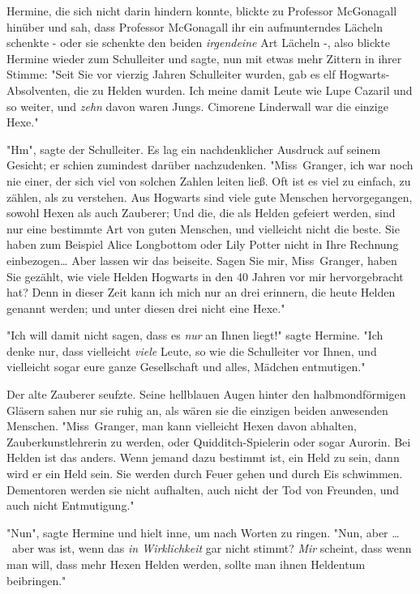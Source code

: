 {Hermine, die sich nicht darin hindern konnte, blickte zu Professor McGonagall hinüber und sah, dass Professor McGonagall ihr ein aufmunterndes Lächeln schenkte - oder sie schenkte den beiden \emph{irgendeine} Art Lächeln -, also blickte Hermine wieder zum Schulleiter und sagte, nun mit etwas mehr Zittern in ihrer Stimme: "Seit Sie vor vierzig Jahren Schulleiter wurden, gab es elf Hogwarts-Absolventen, die zu Helden wurden. Ich meine damit Leute wie Lupe Cazaril und so weiter, und \emph{zehn} davon waren Jungs. Cimorene Linderwall war die einzige Hexe."

"Hm", sagte der Schulleiter. Es lag ein nachdenklicher Ausdruck auf seinem Gesicht; er schien zumindest darüber nachzudenken. "Miss~Granger, ich war noch nie einer, der sich viel von solchen Zahlen leiten ließ. Oft ist es viel zu einfach, zu zählen, als zu verstehen. Aus Hogwarts sind viele gute Menschen hervorgegangen, sowohl Hexen als auch Zauberer; Und die, die als Helden gefeiert werden, sind nur eine bestimmte Art von guten Menschen, und vielleicht nicht die beste. Sie haben zum Beispiel Alice Longbottom oder Lily Potter nicht in Ihre Rechnung einbezogen… Aber lassen wir das beiseite. Sagen Sie mir, Miss~Granger, haben Sie gezählt, wie viele Helden Hogwarts in den 40 Jahren vor mir hervorgebracht hat? Denn in dieser Zeit kann ich mich nur an drei erinnern, die heute Helden genannt werden; und unter diesen drei nicht eine Hexe."

"Ich will damit nicht sagen, dass es \emph{nur} an Ihnen liegt!" sagte Hermine. "Ich denke nur, dass vielleicht \emph{viele} Leute, so wie die Schulleiter vor Ihnen, und vielleicht sogar eure ganze Gesellschaft und alles, Mädchen entmutigen."

Der alte Zauberer seufzte. Seine hellblauen Augen hinter den halbmondförmigen Gläsern sahen nur sie ruhig an, als wären sie die einzigen beiden anwesenden Menschen. "Miss~Granger, man kann vielleicht Hexen davon abhalten, Zauberkunstlehrerin zu werden, oder Quidditch-Spielerin oder sogar Aurorin. Bei Helden ist das anders. Wenn jemand dazu bestimmt ist, ein Held zu sein, dann wird er ein Held sein. Sie werden durch Feuer gehen und durch Eis schwimmen. Dementoren werden sie nicht aufhalten, auch nicht der Tod von Freunden, und auch nicht Entmutigung."

"Nun", sagte Hermine und hielt inne, um nach Worten zu ringen. "Nun, aber … ~aber was ist, wenn das \emph{in Wirklichkeit} gar nicht stimmt? \emph{Mir} scheint, dass wenn man will, dass mehr Hexen Helden werden, sollte man ihnen Heldentum beibringen."

}
